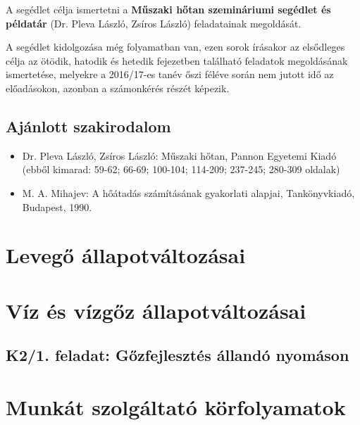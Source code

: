 \documentclass[11pt, a4paper]{report}
\begin{document}
A segédlet célja ismertetni a \textbf{Műszaki hőtan szemináriumi segédlet és példatár} (Dr. Pleva László, Zsíros László) feladatainak megoldását.

A segédlet kidolgozása még folyamatban van, ezen sorok írásakor az elsődleges célja az ötödik, hatodik és hetedik fejezetben található feladatok megoldásának ismertetése, melyekre a 2016/17-es tanév őszi féléve során nem jutott idő az előadásokon, azonban a számonkérés részét képezik.


\section*{Ajánlott szakirodalom}

\begin{itemize}
	\item Dr. Pleva László, Zsíros László: Műszaki hőtan, Pannon Egyetemi Kiadó (ebből kimarad: 59-62; 66-69; 100-104; 114-209; 237-245; 280-309 oldalak)
	\item M. A. Mihajev: A hőátadás számításának gyakorlati alapjai, Tankönyvkiadó, Budapest, 1990.
\end{itemize}





\chapter{Levegő állapotváltozásai}




\chapter{Víz és vízgőz állapotváltozásai}

\section*{K2/1. feladat: Gőzfejlesztés állandó nyomáson}


\chapter{Munkát szolgáltató körfolyamatok}

\end{document}
